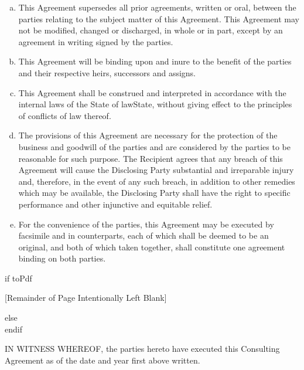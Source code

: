 \documentclass[12pt]{article}
\newcommand{\VAR}[1]{{\color{blue}#1}}
\newcommand{\BLOCK}[1]{{\smallskip \color{red}#1 \\ }}
\begin{document}
\begin{enumerate}[a)]
\item This Agreement supersedes all prior agreements, written or oral, between the parties relating to the subject matter of this Agreement.  This Agreement may not be modified, changed or discharged, in whole or in part, except by an agreement in writing signed by the parties.
\item This Agreement will be binding upon and inure to the benefit of the parties and their respective heirs, successors and assigns.
\item This Agreement shall be construed and interpreted in accordance with the internal laws of the State of \VAR{lawState}, without giving effect to the principles of conflicts of law thereof.
\item The provisions of this Agreement are necessary for the protection of the business and goodwill of the parties and are considered by the parties to be reasonable for such purpose.  The Recipient agrees that any breach of this Agreement will cause the Disclosing Party substantial and irreparable injury and, therefore, in the event of any such breach, in addition to other remedies which may be available, the Disclosing Party shall have the right to specific performance and other injunctive and equitable relief.
\item For the convenience of the parties, this Agreement may be executed by facsimile and in counterparts, each of which shall be deemed to be an original, and both of which taken together, shall constitute one agreement binding on both parties.
\end{enumerate}

\BLOCK{if toPdf}
\vspace{1cm}
\begin{center}
[Remainder of Page Intentionally Left Blank]
\end{center}
\newpage
\BLOCK{else}
\vspace{4cm}
\BLOCK{endif}

IN WITNESS WHEREOF, the parties hereto have executed this Consulting Agreement as of the date and year first above written.\\
\end{document}
